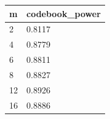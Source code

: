 \begin{tabular}{ll}
\hline
m & codebook\_power \\
\hline
2 & 0.8117 \\
4 & 0.8779 \\
6 & 0.8811 \\
8 & 0.8827 \\
12 & 0.8926 \\
16 & 0.8886 \\
\hline
\end{tabular}

